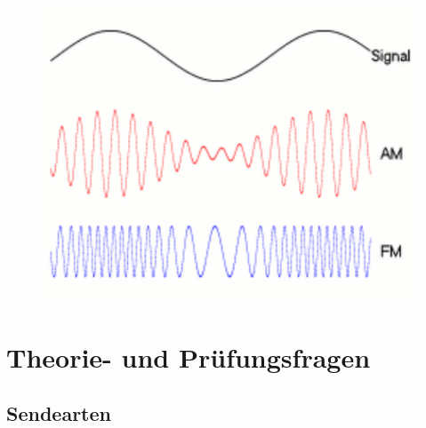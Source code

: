 \begin{figure}
 \vspace{-6cm}
  \includegraphics[scale=0.6]{Modulation/Bilder/Amfm3-en-de.pdf}
 \vspace{-6cm}
\end{figure}

\section*{Theorie- und Prüfungsfragen}


\subsection*{Sendearten}

